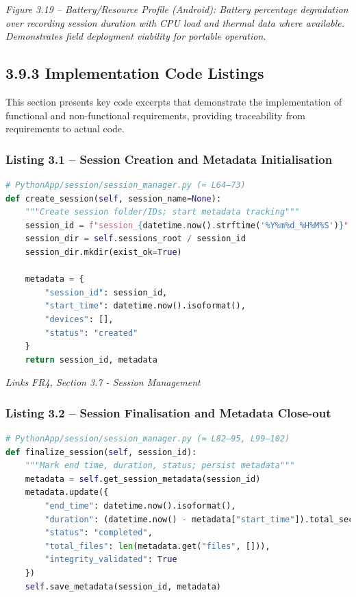 \documentclass[12pt,a4paper]{article}
\begin{document}
\emph{Figure 3.19 -- Battery/Resource Profile (Android): Battery percentage degradation over recording session duration with CPU load and thermal data where available. Demonstrates field deployment viability for portable operation.}

\subsection{3.9.3 Implementation Code Listings}\label{implementation-code-listings}

This section presents key code excerpts that demonstrate the implementation of functional and non-functional requirements, providing traceability from requirements to actual code.

\subsubsection{Listing 3.1 -- Session Creation and Metadata Initialisation}\label{listing-3.1-session-creation-and-metadata-initialisation}

\begin{lstlisting}[language=Python]
# PythonApp/session/session_manager.py (≈ L64–73)
def create_session(self, session_name=None):
    """Create session folder/IDs; start metadata tracking"""
    session_id = f"session_{datetime.now().strftime('%Y%m%d_%H%M%S')}"
    session_dir = self.sessions_root / session_id
    session_dir.mkdir(exist_ok=True)
    
    metadata = {
        "session_id": session_id,
        "start_time": datetime.now().isoformat(),
        "devices": [],
        "status": "created"
    }
    return session_id, metadata
\end{lstlisting}

\emph{Links FR4, Section 3.7 - Session Management}

\subsubsection{Listing 3.2 -- Session Finalisation and Metadata Close-out}\label{listing-3.2-session-finalisation-and-metadata-close-out}

\begin{lstlisting}[language=Python]
# PythonApp/session/session_manager.py (≈ L82–95, L99–102)
def finalize_session(self, session_id):
    """Mark end time, duration, status; persist metadata"""
    metadata = self.get_session_metadata(session_id)
    metadata.update({
        "end_time": datetime.now().isoformat(),
        "duration": (datetime.now() - metadata["start_time"]).total_seconds(),
        "status": "completed",
        "total_files": len(metadata.get("files", [])),
        "integrity_validated": True
    })
    self.save_metadata(session_id, metadata)
\end{lstlisting}
\end{document}
